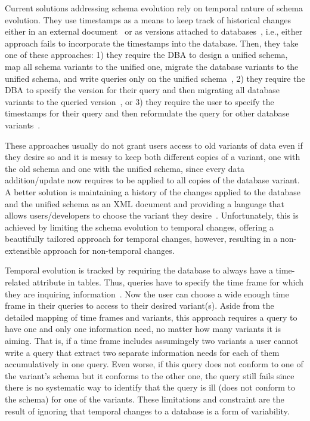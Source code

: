 Current solutions addressing schema evolution rely on
temporal nature of schema evolution. They use timestamps as a 
means to keep track of historical changes either in an external document~\cite{prima08Moon}
or as versions attached to 
databases~\cite{SchEvolRA90McKenzie, schVersioning97Castro, tempSchEvol91Ariav, tsql95Snodgrass}, 
i.e., either approach fails to incorporate
the timestamps into the database. 
Then, they take one of these approaches:
1) they require the DBA to design a unified schema, map all schema variants
to the unified one, migrate the database variants to the unified schema, and
write queries only on the unified schema~\cite{schEvolUnifyApp},
2) they require the DBA to specify the version for their query and then migrating
all database variants to the queried 
version~\cite{SchEvolRA90McKenzie, schVersioning97Castro, tempSchEvol91Ariav, tsql95Snodgrass},
or 3) they require the user to specify the timestamps for their query and
then reformulate the query for other database variants~\cite{prima08Moon}.


These approaches usually do not
grant users access to old variants of data even if they desire so and it
is messy to keep both different copies of a variant, one with the old schema
and one with the unified schema, since every data addition/update now requires to 
be applied to all copies of the database variant. A better solution
is maintaining a history of the changes applied to the database and the unified schema
as an XML document and providing a language that allows users/developers to choose
the variant they desire~\cite{prima08Moon}. Unfortunately, this is achieved by limiting
the schema evolution to temporal changes, offering a beautifully tailored approach for 
temporal changes, however, resulting in a non-extensible approach for non-temporal changes.

Temporal evolution is tracked by requiring the database to always have a time-related 
attribute in tables. Thus, queries have to specify the time frame for which they are inquiring 
information~\cite{prima08Moon}. 
Now the user can choose a wide enough time frame in their queries to access 
to their desired variant(s). Aside from the detailed mapping of time frames and variants, this
approach requires a query to have one and only one information need, no matter how many
variants it is aiming. That is, if a time frame includes assumingely two variants a user cannot 
write a query that extract two separate information needs for each of them accumulatively 
in one query. Even worse, if this query does not conform to one of the variant's schema
but it conforms to the other one, the query still fails since there is no systematic way to 
identify that the query is ill (does not conform to the schema) for one of the variants. 
These limitations and constraint are the result of ignoring that temporal changes to a 
database is a form of variability.

